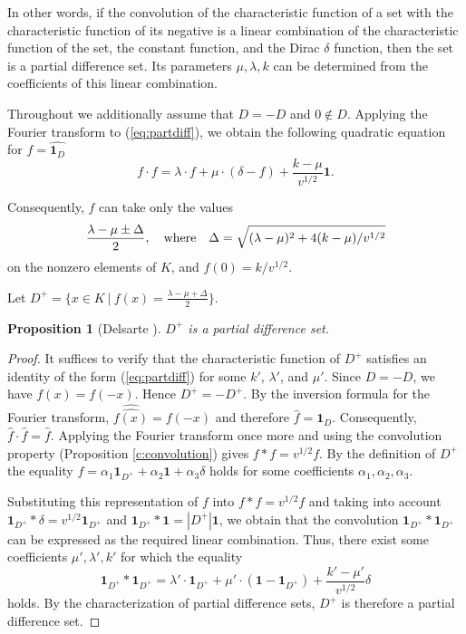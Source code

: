 \documentclass[11pt]{article}
\newtheorem{claim}{Proposition}[section]
\theoremstyle{definition}
\begin{document}
{{{In other words, if the convolution  of the characteristic function
of a set with  the characteristic function of its negative is a linear combination of the characteristic function
of the set, the constant function, and the Dirac $\delta$ function, then the set
is a partial difference set. Its parameters $\mu,\lambda,k$
can be determined from the coefficients of this linear combination. 

Throughout 
we additionally assume that $D=-D$ and $0\notin D$.
Applying the Fourier transform to
(\ref{eq:partdiff}), we obtain the following quadratic equation for $f=\widehat{{\mathbf 1}_{D}}$
$$
f \cdot f=\lambda\cdot f+\mu\cdot(\delta-f)+
\frac{k-\mu}{v^{1/2}}\mathbf{1}.$$

Consequently,  $f$ can take only the values
$$\frac{\lambda-\mu\pm\Delta}{2},\quad \mbox{\rm where}\quad
\Delta=\sqrt{(\lambda-\mu)^2+4(k-\mu)/v^{1/2}}$$ on the nonzero
elements of $K$, and $f(0)=k/v^{1/2}$.

Let $D^+=\{x\in K \ | \ f(x)=\frac{\lambda-\mu +\Delta}{2}\}$.

\begin{claim}[Delsarte \cite{Ma}]
$D^+$ is a partial difference set.
\end{claim}
\begin{proof}
It suffices to verify that   the characteristic function of $D^+$  satisfies an identity of the form  (\ref{eq:partdiff})  for
some $k'$, $\lambda'$, and $\mu'$. Since $D=-D$,  we have $f(x)=f(-x)$. Hence $D^+=-D^+$. 
By the inversion formula for the Fourier transform,
 $\widehat{\widehat{f(x)}}=f(-x)$ and therefore
$\widehat{f}={\mathbf 1}_{D}$. 
Consequently,
$\widehat{f}\cdot\widehat{f}=\widehat{f}$. Applying the Fourier
transform once more and using the convolution property   (Proposition \ref{c:convolution}) gives $f*
f=v^{1/2}f$. By the definition of $D^+$ the equality
$f=\alpha_1{\mathbf 1}_{{D^+}} + \alpha_2\mathbf{1}+ \alpha_3\delta$ holds for
some coefficients $\alpha_1, \alpha_2, \alpha_3$. 


Substituting
this representation of $f$ into $f* f=v^{1/2}f$ and taking into account
${\mathbf 1}_{D^+}*\delta=v^{1/2}{\mathbf 1}_{D^+}$ and
${\mathbf 1}_{D^+}*\mathbf{1}=|D^+|\mathbf{1}$, we obtain that the convolution
${\mathbf 1}_{D^+} *{\mathbf 1}_{D^+}$ can be expressed as the required linear
combination. Thus, there exist some coefficients
$\mu',\lambda',k'$ for which
the equality
$${\mathbf 1}_{D^+}
*{\mathbf 1}_{D^+}=\lambda'\cdot{\mathbf 1}_{D^+}+\mu'\cdot(\mathbf{1}-{\mathbf 1}_{D^+})+
\frac{k'-\mu'}{v^{1/2}}\delta$$
holds. By the characterization of partial difference sets, $D^+$ is therefore a partial difference set.
\end{proof}


}}}
\end{document}
